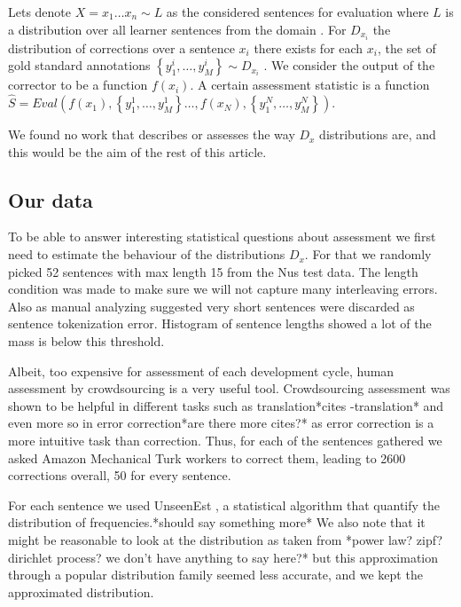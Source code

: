 \documentclass[11pt]{article}
\begin{document}
Lets denote $X=x_{1}\ldots x_n\sim L$ as the considered
sentences for evaluation where $L$ is a distribution over all learner sentences from the domain . 
For $D_{x_i}$ the distribution of corrections over a sentence $x_i$ there exists for each $x_{i}$, the set of gold standard annotations $\left\{ y_{1}^{i},\ldots,y_{M}^{i}\right\} \sim D_{x_i}$ . We consider the  output of
the corrector to be a function $f\left(x_{i}\right)$. A certain assessment
statistic is a function $\hat{S}=Eval\left(f\left(x_{1}\right),\left\{ y_{1}^{1},\ldots,y_{M}^{1}\right\} \ldots,f\left(x_{N}\right),\left\{ y_{1}^{N},\ldots,y_{M}^{N}\right\} \right)$.

We found no work that describes or assesses the way $D_x$ distributions are, and this would be the aim of the rest of this article. 

\subsection{Our data}
To be able to answer interesting statistical questions about assessment we first need to estimate the behaviour of the distributions $D_x$. For that we randomly picked 52 sentences with max length 15 from the Nus \cite{dahlmeier2013building} test data. The length condition was made to make sure we will not capture many interleaving errors. Also as manual analyzing suggested very short sentences were discarded as sentence tokenization error. Histogram of sentence lengths showed a lot of the mass is below this threshold.

Albeit, too expensive for assessment of each development cycle, human assessment by crowdsourcing is a very useful tool. Crowdsourcing assessment was shown to be helpful in different tasks such as translation{*}cites -translation{*} and even more so in error correction\cite{madnani2011they}{*}are there more cites?{*} as error correction is a more intuitive task than correction. Thus, for each of the sentences gathered we asked Amazon Mechanical Turk workers to correct them, leading to 2600 corrections overall, 50 for every sentence.

For each sentence we used UnseenEst \cite{zou2015quantifying}, a statistical algorithm that quantify the distribution of frequencies.{*}should say something more{*} We also note that it might be reasonable to look at the distribution as taken from {*}power law? zipf? dirichlet process? we don't have anything to say here?{*} but this approximation through a popular distribution family seemed less accurate, and we kept the approximated distribution.
\end{document}
